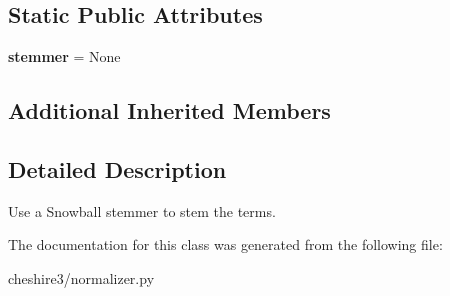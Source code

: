 \subsection*{Static Public Attributes}
\begin{DoxyCompactItemize}
\item 
\hypertarget{classcheshire3_1_1normalizer_1_1_stem_normalizer_a7cbebc8c1a11459173d721cbb5d7efc8}{{\bfseries stemmer} = None}\label{classcheshire3_1_1normalizer_1_1_stem_normalizer_a7cbebc8c1a11459173d721cbb5d7efc8}

\end{DoxyCompactItemize}
\subsection*{Additional Inherited Members}


\subsection{Detailed Description}
\begin{DoxyVerb}Use a Snowball stemmer to stem the terms.\end{DoxyVerb}
 

The documentation for this class was generated from the following file\-:\begin{DoxyCompactItemize}
\item 
cheshire3/normalizer.\-py\end{DoxyCompactItemize}
